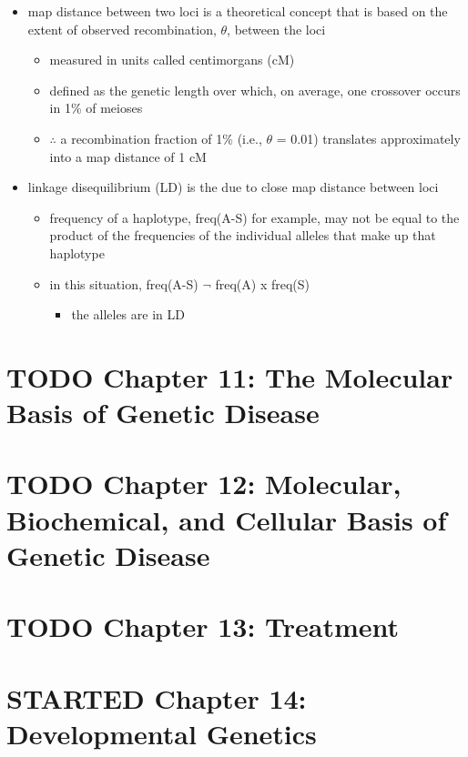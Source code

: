 \documentclass[12pt]{scrartcl}
\begin{document}
\begin{itemize}
\item map distance between two loci is a theoretical concept that is based
on the extent of observed recombination, \(\theta\), between the
loci
\begin{itemize}
\item measured in units called centimorgans (cM)
\item defined as the genetic length over which, on average, one
crossover occurs in 1\% of meioses
\item \(\therefore\) a recombination fraction of 1\% (i.e., \(\theta\) = 0.01)
translates approximately into a map distance of 1 cM
\end{itemize}

\item linkage disequilibrium (LD) is the due to close map distance between loci
\begin{itemize}
\item frequency of a haplotype, freq(A-S) for example, may not be equal
to the product of the frequencies of the individual alleles that
make up that haplotype
\item in this situation, freq(A-S) \(\neg{}\) freq(A) x freq(S)
\begin{itemize}
\item the alleles are in LD
\end{itemize}
\end{itemize}
\end{itemize}
\section{{\bfseries\sffamily TODO} Chapter 11: The Molecular Basis of Genetic Disease}
\label{sec:orge16e134}
\section{{\bfseries\sffamily TODO} Chapter 12: Molecular, Biochemical, and Cellular Basis of Genetic Disease}
\label{sec:orga0628e2}
\section{{\bfseries\sffamily TODO} Chapter 13: Treatment}
\label{sec:orgb19b733}
\section{{\bfseries\sffamily STARTED} Chapter 14: Developmental Genetics}
\label{sec:org08ef19d}
\end{document}
